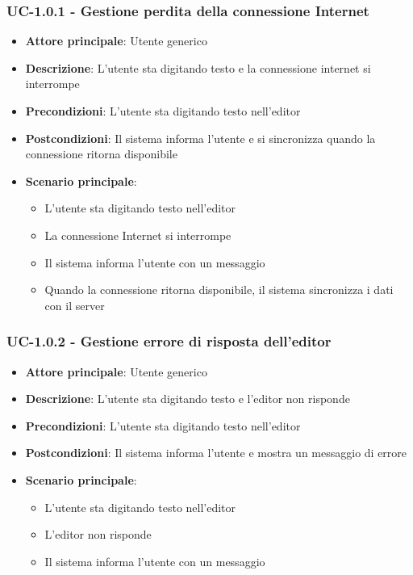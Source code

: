 \documentclass[11pt,a4paper]{article}
\begin{document}
\subsubsection{UC-1.0.1 - Gestione perdita della connessione Internet}
\begin{itemize}
    \item \textbf{Attore principale}: Utente generico
    \item \textbf{Descrizione}: L'utente sta digitando testo e la connessione internet si interrompe
    \item \textbf{Precondizioni}: L'utente sta digitando testo nell'editor
    \item \textbf{Postcondizioni}: Il sistema informa l'utente e si sincronizza quando la connessione ritorna disponibile
    \item \textbf{Scenario principale}:
        \begin{itemize}
            \item L'utente sta digitando testo nell'editor
            \item La connessione Internet si interrompe
            \item Il sistema informa l'utente con un messaggio
            \item Quando la connessione ritorna disponibile, il sistema sincronizza i dati con il server
        \end{itemize}
\end{itemize}

\subsubsection{UC-1.0.2 - Gestione errore di risposta dell'editor}
\begin{itemize}
    \item \textbf{Attore principale}: Utente generico
    \item \textbf{Descrizione}: L'utente sta digitando testo e l'editor non risponde
    \item \textbf{Precondizioni}: L'utente sta digitando testo nell'editor
    \item \textbf{Postcondizioni}: Il sistema informa l'utente e mostra un messaggio di errore
    \item \textbf{Scenario principale}:
        \begin{itemize}
            \item L'utente sta digitando testo nell'editor
            \item L'editor non risponde
            \item Il sistema informa l'utente con un messaggio
        \end{itemize}
\end{itemize}
\end{document}

